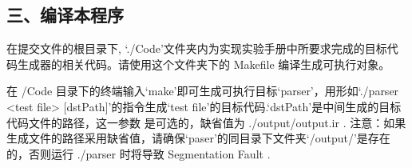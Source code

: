 \documentclass[a4paper,UTF8]{article}
\theoremstyle{definition}
\begin{document}
\begin{CJK}{UTF8}{gkai}
\begin{CJK*}{UTF8}{gbsn}
\section*{三、编译本程序}
\end{CJK*}
\par 在提交文件的根目录下, `./Code'文件夹内为实现实验手册中所要求完成的目标代码生成器的相关代码。请使用这个文件夹下的 Makefile 编译生成可执行对象。
\par 在 /Code 目录下的终端输入`make'即可生成可执行目标`parser'，用形如`./parser <test file> [dstPath]'的指令生成`test file'的目标代码.`dstPath'是中间生成的目标代码文件的路径，这一参数
是可选的，缺省值为 ./output/output.ir . 注意：如果生成文件的路径采用缺省值，请确保`paser'的同目录下文件夹`/output/'是存在的，否则运行 ./parser 时将导致 Segmentation Fault .

\newpage
\end{CJK}
\end{document}
